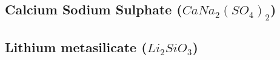\documentclass[../../Report.tex]{subfiles}
\begin{document}
    \subsection{\large Calcium Sodium Sulphate ($CaNa_2{(SO_4)}_2$)}
        
    \newpage
    \subsection{\large Lithium metasilicate ($Li_2SiO_3$)}
        
\end{document}
